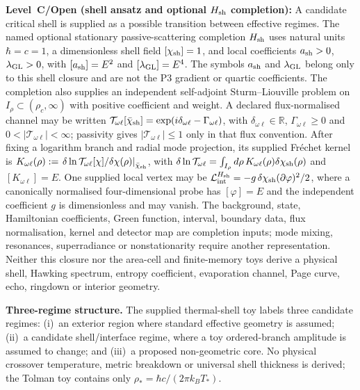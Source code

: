 \documentclass[11pt,a4paper]{article}
\begin{document}
\textbf{Level~C/Open (shell ansatz and optional $H_{\rm sh}$ completion):}
A candidate critical shell is supplied as a possible transition between
effective regimes.  The named optional stationary passive-scattering
completion $H_{\rm sh}$ uses natural units $\hbar=c=1$, a dimensionless shell
field $[\chi_{\rm sh}]=1$, and local coefficients
$a_{\rm sh}>0$, $\lambda_{\rm GL}>0$, with
$[a_{\rm sh}]=E^2$ and $[\lambda_{\rm GL}]=E^4$.  The symbols
$a_{\rm sh}$ and $\lambda_{\rm GL}$ belong only to this shell closure and are
not the P3 gradient or quartic coefficients.  The completion also supplies an
independent self-adjoint
Sturm--Liouville problem on $I_\rho\subset(\rho_c,\infty)$ with positive
coefficient and weight.  A declared flux-normalised channel may be written
$\mathcal T_{\omega\ell}[\bar\chi_{\rm sh}]
=\exp(i\delta_{\omega\ell}-\Gamma_{\omega\ell})$, with
$\delta_{\omega\ell}\in\mathbb R$, $\Gamma_{\omega\ell}\ge0$ and
$0<|\mathcal T_{\omega\ell}|<\infty$; passivity gives
$|\mathcal T_{\omega\ell}|\le1$ only in that flux convention.  After fixing a
logarithm branch and radial mode projection, its supplied Fr\'echet kernel is
$K_{\omega\ell}(\rho):=\left.\delta\ln\mathcal T_{\omega\ell}[\chi]
/\delta\chi(\rho)\right|_{\bar\chi_{\rm sh}}$, with
$\delta\ln\mathcal T_{\omega\ell}=\int_{I_\rho}d\rho\,
K_{\omega\ell}(\rho)\delta\chi_{\rm sh}(\rho)$ and
$[K_{\omega\ell}]=E$.  One supplied local vertex may be
$\mathcal L_{\rm int}^{H_{\rm sh}}=-g\,\delta\chi_{\rm sh}
(\partial\varphi)^2/2$, where a canonically normalised four-dimensional probe
has $[\varphi]=E$ and the independent coefficient $g$ is dimensionless and may
vanish.  The background, state, Hamiltonian coefficients, Green function,
interval, boundary data, flux normalisation, kernel and detector map are
completion inputs; mode mixing, resonances, superradiance or nonstationarity
require another representation.  Neither this closure nor the area-cell and
finite-memory toys derive a physical shell, Hawking spectrum, entropy
coefficient, evaporation channel, Page curve, echo, ringdown or interior
geometry.



\textbf{Three-regime structure.}
The supplied thermal-shell toy labels three candidate regimes:
(i)~an exterior region where standard effective geometry is assumed;
(ii)~a candidate shell/interface regime, where a toy ordered-branch amplitude is assumed to change;
and (iii)~a proposed non-geometric core.  No physical crossover temperature, metric breakdown or universal shell thickness is derived; the Tolman toy contains only $\rho_*=\hbar c/(2\pi k_BT_*)$.
\end{document}
